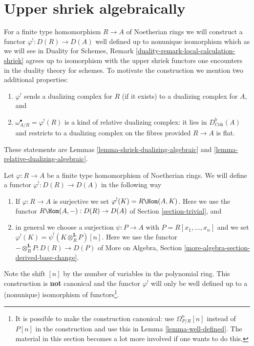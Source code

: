 \section{Upper shriek algebraically}
\label{section-relative-dualizing-complex-algebraic}

\noindent
For a finite type homomorphism $R \to A$ of Noetherian rings
we will construct a functor $\varphi^! : D(R) \to D(A)$
well defined up to nonunique isomorphism which
as we will see in Duality for Schemes, Remark
\ref{duality-remark-local-calculation-shriek}
agrees up to isomorphism with the upper shriek functors
one encounters in the duality theory for schemes.
To motivate the construction we mention two additional properties:
\begin{enumerate}
\item $\varphi^!$ sends a dualizing complex for $R$ (if it exists)
to a dualizing complex for $A$, and
\item $\omega_{A/R}^\bullet = \varphi^!(R)$ is a kind of
relative dualizing complex: it lies in $D^b_{\textit{Coh}}(A)$ and restricts
to a dualizing complex on the fibres provided $R \to A$ is flat.
\end{enumerate}
These statements are Lemmas \ref{lemma-shriek-dualizing-algebraic} and
\ref{lemma-relative-dualizing-algebraic}.

\medskip\noindent
Let $\varphi : R \to A$ be a finite type homomorphism of Noetherian rings.
We will define a functor $\varphi^! : D(R) \to D(A)$ in the following way
\begin{enumerate}
\item If $\varphi : R \to A$ is surjective we set
$\varphi^!(K) = R\Hom(A, K)$. Here we use the functor
$R\Hom(A, -) : D(R) \to D(A)$ of
Section \ref{section-trivial}, and
\item in general we choose a surjection $\psi : P \to A$ with
$P = R[x_1, \ldots, x_n]$ and we set
$\varphi^!(K) = \psi^!(K \otimes_R^\mathbf{L} P)[n]$.
Here we use the functor
$- \otimes_R^\mathbf{L} P : D(R) \to D(P)$
of More on Algebra, Section \ref{more-algebra-section-derived-base-change}.
\end{enumerate}
Note the shift $[n]$ by the number of variables in the polynomial
ring. This construction is {\bf not} canonical and the functor
$\varphi^!$ will only be well defined up to a (nonunique) isomorphism of
functors\footnote{It is possible to make the construction canonical:
use $\Omega^n_{P/R}[n]$ instead of $P[n]$ in the
construction and use this in Lemma \ref{lemma-well-defined}.
The material in this section becomes a lot more involved
if one wants to do this.}.

